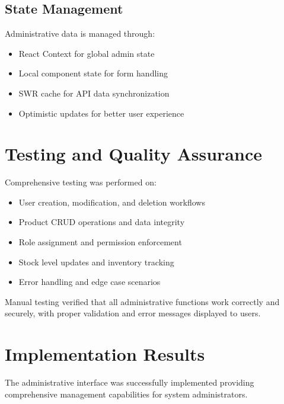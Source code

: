 \subsection*{State Management}

Administrative data is managed through:
\begin{itemize}
  \item React Context for global admin state
  \item Local component state for form handling
  \item SWR cache for API data synchronization
  \item Optimistic updates for better user experience
\end{itemize}

\section{Testing and Quality Assurance}

Comprehensive testing was performed on:

\begin{itemize}
  \item User creation, modification, and deletion workflows
  \item Product CRUD operations and data integrity
  \item Role assignment and permission enforcement
  \item Stock level updates and inventory tracking
  \item Error handling and edge case scenarios
\end{itemize}

Manual testing verified that all administrative functions work correctly and securely, with proper validation and error messages displayed to users.

\section{Implementation Results}

The administrative interface was successfully implemented providing comprehensive management capabilities for system administrators.

